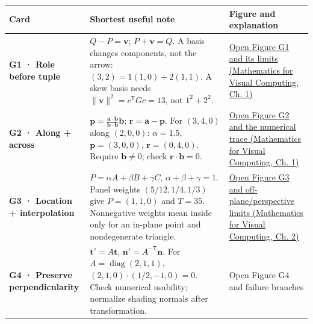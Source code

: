 {\def\LTcaptype{none} %
\begin{longtable}[]{@{}
  >{\raggedright\arraybackslash}p{}
  >{\raggedright\arraybackslash}p{}
  >{\raggedright\arraybackslash}p{}@{}}
\toprule\noalign{}
\begin{minipage}[b]{\linewidth}\raggedright
Card
\end{minipage} & \begin{minipage}[b]{\linewidth}\raggedright
Shortest useful note
\end{minipage} & \begin{minipage}[b]{\linewidth}\raggedright
Figure and explanation
\end{minipage} \\
\midrule\noalign{}
\endhead
\bottomrule\noalign{}
\endlastfoot
\textbf{G1 · Role before tuple} & \(Q-P=\mathbf v\); \(P+\mathbf v=Q\). A basis changes components, not the arrow: \((3,2)=1(1,0)+2(1,1)\). A skew basis needs \(\|\mathbf v\|^2=c^\mathsf TGc=13\), not \(1^2+2^2\). & \href{../02-Mathematics-for-Visual-Computing/main.pdf\#nameddest=01-foundations-i-ch017-g1---one-movement-two-descriptions}{Open Figure G1 and its limits (Mathematics for Visual Computing, Ch. 1)} \\
\textbf{G2 · Along + across} & \(\mathbf p=\frac{\mathbf a\cdot\mathbf b}{\mathbf b\cdot\mathbf b}\mathbf b\); \(\mathbf r=\mathbf a-\mathbf p\). For \((3,4,0)\) along \((2,0,0)\): \(\alpha=1.5\), \(\mathbf p=(3,0,0)\), \(\mathbf r=(0,4,0)\). Require \(\mathbf b\ne0\); check \(\mathbf r\cdot\mathbf b=0\). & \href{../02-Mathematics-for-Visual-Computing/main.pdf\#nameddest=01-foundations-i-ch017-g2---split-the-request-into-rail-travel-and-sideways-travel}{Open Figure G2 and the numerical trace (Mathematics for Visual Computing, Ch. 1)} \\
\textbf{G3 · Location + interpolation} & \(P=\alpha A+\beta B+\gamma C\), \(\alpha+\beta+\gamma=1\). Panel weights \((5/12,1/4,1/3)\) give \(P=(1,1,0)\) and \(T=35\). Nonnegative weights mean inside only for an in-plane point and nondegenerate triangle. & \href{../02-Mathematics-for-Visual-Computing/main.pdf\#nameddest=01-foundations-i-ch018-g3---reconstruct-a-sensor-location-from-the-corners}{Open Figure G3 and off-plane/perspective limits (Mathematics for Visual Computing, Ch. 2)} \\
\textbf{G4 · Preserve perpendicularity} & \(\mathbf t'=A\mathbf t\), \(\mathbf n'=A^{-\mathsf T}\mathbf n\). For \(A=\operatorname{diag}(2,1,1)\), \((2,1,0)\cdot(1/2,-1,0)=0\). Check numerical usability; normalize shading normals after transformation. & {Open Figure G4 and failure branches} \\
\end{longtable}
}

